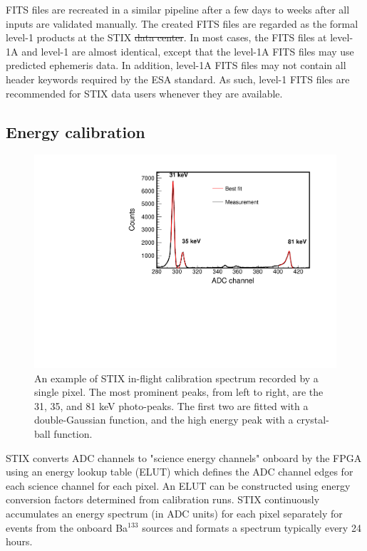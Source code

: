 \documentclass[referee]{aa} %
\providecommand{\DIFaddtex}[1]{{\protect\color{blue}\uwave{#1}}} %
\providecommand{\DIFdeltex}[1]{{\protect\color{red}\sout{#1}}}                      %
\providecommand{\DIFaddbegin}{} %
\providecommand{\DIFaddend}{} %
\providecommand{\DIFdelbegin}{} %
\providecommand{\DIFdelend}{} %
\providecommand{\DIFadd}[1]{\texorpdfstring{\DIFaddtex{#1}}{#1}} %
\providecommand{\DIFdel}[1]{\texorpdfstring{\DIFdeltex{#1}}{}} %
\newcommand{\DIFscaledelfig}{0.5}
\newlength{\DIFdelgraphicswidth} %
\newlength{\DIFdelgraphicsheight} %
\newcommand{\DIFaddincludegraphics}[2][]{{\color{blue}\fbox{\DIFOincludegraphics[#1]{#2}}}} %
\newcommand{\DIFdelincludegraphics}[2][]{%
\sbox{\DIFdelgraphicsbox}{\DIFOincludegraphics[#1]{#2}}%
\settoboxwidth{\DIFdelgraphicswidth}{\DIFdelgraphicsbox} %
\settoboxtotalheight{\DIFdelgraphicsheight}{\DIFdelgraphicsbox} %
\scalebox{\DIFscaledelfig}{%
\parbox[b]{\DIFdelgraphicswidth}{\usebox{\DIFdelgraphicsbox}\\[-\baselineskip] \rule{\DIFdelgraphicswidth}{0em}}\llap{\resizebox{\DIFdelgraphicswidth}{\DIFdelgraphicsheight}{%
\setlength{\unitlength}{\DIFdelgraphicswidth}%
\begin{picture}(1,1)%
\thicklines\linethickness{2pt} %
{\color[rgb]{1,0,0}\put(0,0){\framebox(1,1){}}}%
{\color[rgb]{1,0,0}\put(0,0){\line( 1,1){1}}}%
{\color[rgb]{1,0,0}\put(0,1){\line(1,-1){1}}}%
\end{picture}%
}\hspace*{3pt}}} %
} %
\DeclareRobustCommand{\DIFaddbegin}{\DIFOaddbegin \let\includegraphics\DIFaddincludegraphics} %
\DeclareRobustCommand{\DIFaddend}{\DIFOaddend \let\includegraphics\DIFOincludegraphics} %
\DeclareRobustCommand{\DIFdelbegin}{\DIFOdelbegin \let\includegraphics\DIFdelincludegraphics} %
\DeclareRobustCommand{\DIFdelend}{\DIFOaddend \let\includegraphics\DIFOincludegraphics} %
\begin{document}
FITS files are recreated 
in a similar pipeline after a few days to weeks after all inputs are validated manually. The created FITS files are regarded as the formal level-1 products at the STIX \DIFdelbegin \DIFdel{data center}\DIFdelend \DIFaddbegin \DIFadd{Data Center}\DIFaddend . 
In most cases, the FITS files at level-1A and level-1 are almost identical, except that the level-1A FITS files may use predicted ephemeris data. In addition, level-1A FITS files may not contain all header keywords required by the ESA standard.  As such, level-1 FITS files are recommended for STIX data users whenever they are available. 

\subsection{Energy calibration}
\begin{figure}
 \centering
  \includegraphics[width=0.8\linewidth]{figures/cal-fit.pdf}
  \caption{An example of  STIX in-flight calibration spectrum recorded by a single pixel.
  The most prominent peaks, from left to right, are the 31, 35, and 81 keV photo-peaks. The first two are fitted with a double-Gaussian function, and the high energy peak with a crystal-ball function. }
    \label{fig:cal-fit}
\end{figure}
STIX converts ADC channels to "science energy channels" onboard by the FPGA using an energy lookup table (ELUT) 
which defines the ADC channel edges for each science channel for each pixel.
An ELUT can be constructed using energy conversion factors determined from calibration runs. 
STIX continuously accumulates an energy spectrum (in ADC units) for each pixel separately for events from the onboard Ba$^{133}$ sources and formats a spectrum typically every 24 hours. 
\end{document}
